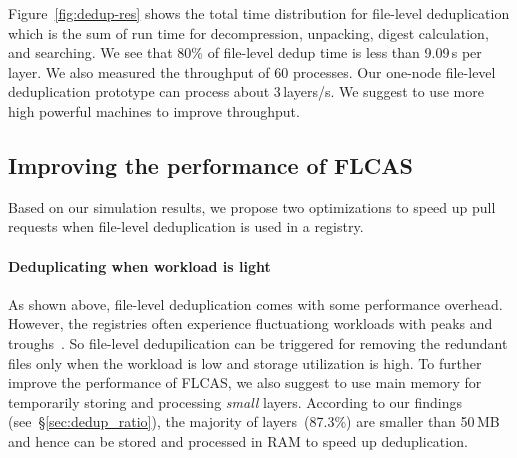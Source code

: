 Figure~\ref{fig:dedup-res} shows the total time distribution for
file-level deduplication which is the sum of run time for decompression, unpacking,
digest calculation, and searching. 
%
We see that 80\% of file-level dedup time is
less than 9.09\,s per layer.
%
%
We also measured the throughput of 60 processes. 
%
Our one-node file-level
deduplication prototype can process about 3\,layers/s. 
%
We suggest to use more
high powerful machines to improve throughput.
 
%
\subsection{Improving the performance of FLCAS}

Based on our simulation results, we propose two optimizations
to speed up pull requests when file-level deduplication is used
in a registry.

\paragraph{Deduplicating when workload is light}

As shown above, file-level deduplication comes with some performance overhead.
%
However, the registries often experience fluctuationg workloads with
peaks and troughs~\cite{dockerworkload}.
%
%
%
So file-level dedupilication can be triggered for removing the redundant files 
only when the workload is low and storage utilization is high.
%
To further improve the performance of FLCAS, we also suggest to use main memory
for temporarily storing and processing \textit{small} layers.
%
According to our findings (see~\S\ref{sec:dedup_ratio}), the majority of layers~(87.3\%)
are smaller than 50\,MB and hence can be stored and processed in RAM to speed up
deduplication. 

